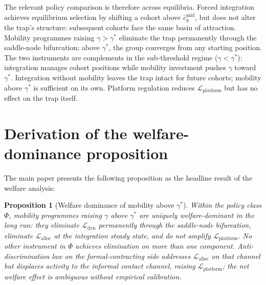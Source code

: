 \documentclass[12pt,a4paper]{article}
\newtheorem{proposition}{Proposition}
\theoremstyle{definition}
\numberwithin{proposition}{section}
\begin{document}
The relevant policy comparison is therefore across equilibria.
Forced integration achieves equilibrium selection by shifting a
cohort above $\bar{c}_g^{\mathrm{mid}}$, but does not alter the
trap's structure: subsequent cohorts face the same basin of
attraction. Mobility programmes raising $\gamma > \gamma^*$
eliminate the trap permanently through the saddle-node bifurcation;
above $\gamma^*$, the group converges from any starting position.
The two instruments are complements in the sub-threshold regime
($\gamma < \gamma^*$): integration manages cohort positions while
mobility investment pushes $\gamma$ toward $\gamma^*$. Integration
without mobility leaves the trap intact for future cohorts;
mobility above $\gamma^*$ is sufficient on its own. Platform
regulation reduces $\mathcal{L}_{\text{platform}}$ but has no
effect on the trap itself.

\section{Derivation of the welfare-dominance proposition}
\label{sec:welfare-dominance}

The main paper presents the following proposition as the headline
result of the welfare analysis:

\begin{proposition}[Welfare dominance of mobility above $\gamma^*$]
\label{prop:dominance}
Within the policy class $\Phi$, mobility programmes raising
$\gamma$ above $\gamma^*$ are uniquely welfare-dominant in the long
run: they eliminate $\mathcal{L}_{\mathrm{dyn}}$ permanently
through the saddle-node bifurcation, eliminate
$\mathcal{L}_{\mathrm{alloc}}$ at the integration steady state, and
do not amplify $\mathcal{L}_{\mathrm{platform}}$. No other
instrument in $\Phi$ achieves elimination on more than one
component. Anti-discrimination law on the formal-contracting side
addresses $\mathcal{L}_{\mathrm{alloc}}$ on that channel but
displaces activity to the informal contact channel, raising
$\mathcal{L}_{\mathrm{platform}}$; the net welfare effect is
ambiguous without empirical calibration.
\end{proposition}
\end{document}
